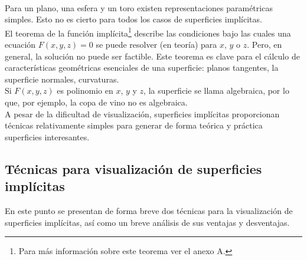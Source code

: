 \documentclass[12pt]{article}
\begin{document}
\\Para un plano, una esfera y un toro existen representaciones paramétricas simples. Esto no es cierto para todos los casos de superficies implícitas.
\\El teorema de la función implícita\footnote{Para más información sobre este teorema ver el anexo A.} describe las condiciones bajo las cuales una ecuación $F (x, y, z) = 0$ se puede resolver (en teoría) para $x$, $y$ o $z$. Pero, en general, la solución no puede ser factible. Este teorema es clave para el cálculo de características geométricas esenciales de una superficie: planos tangentes, la superficie normales, curvaturas.
\\Si $F (x, y, z)$ es polinomio en $x$, $y$ y $z$, la superficie se llama algebraica, por lo que, por ejemplo, la copa de vino no es algebraica.
\\A pesar de la dificultad de visualización, superficies implícitas proporcionan técnicas relativamente simples para generar de forma teórica y práctica superficies interesantes.
\clearpage
\subsection{Técnicas para visualización de superficies implícitas}
En este punto se presentan de forma breve dos técnicas para la visualización de superficies implícitas, así como un breve análisis de sus ventajas y desventajas.
\end{document}
